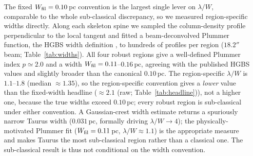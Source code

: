 \documentclass[usenatbib,twoside,twocolumn]{mnras}
\begin{document}
The fixed $W_{\rm fil}=0.10$\,pc convention is the largest single lever on $\lambda/W$, comparable to the whole sub-classical discrepancy, so we measured region-specific widths directly. Along each skeleton spine we sampled the column-density profile perpendicular to the local tangent and fitted a beam-deconvolved Plummer function, the HGBS width definition \citep{Arzoumanian2019}, to hundreds of profiles per region ($18.2''$ beam; Table~\ref{tab:widths}). All four robust regions give a well-defined Plummer index $p\simeq2.0$ and a width $W_{\rm fil}=0.11$--$0.16$\,pc, agreeing with the published HGBS values \citep{Arzoumanian2019} and slightly broader than the canonical $0.10$\,pc. The region-specific $\lambda/W$ is $1.1$--$1.8$ (median $\approx1.35$), so the region-specific convention gives a \emph{lower} value than the fixed-width headline ($\approx2.1$ (raw; Table~\ref{tab:headline})), not a higher one, because the true widths exceed $0.10$\,pc; every robust region is sub-classical under either convention. A Gaussian-crest width estimate returns a spuriously narrow Taurus width ($0.031$\,pc, formally driving $\lambda/W\to4$); the physically-motivated Plummer fit ($W_{\rm fil}=0.11$\,pc, $\lambda/W\approx1.1$) is the appropriate measure and makes Taurus the most sub-classical region rather than a classical one. The sub-classical result is thus not conditional on the width convention.
\end{document}
